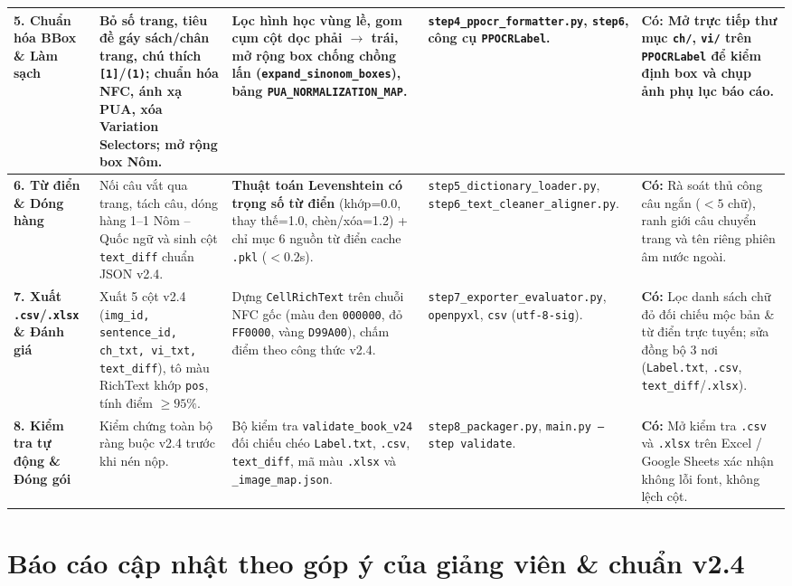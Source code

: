 \documentclass[12pt,a4paper]{article}
\begin{document}
\begin{longtable}{>{\raggedright\arraybackslash}p{2.4cm} >{\raggedright\arraybackslash}p{3.8cm} >{\raggedright\arraybackslash}p{4.3cm} >{\raggedright\arraybackslash}p{2.7cm} >{\raggedright\arraybackslash}p{3.0cm}}
\midrule
\textbf{5. Chuẩn hóa BBox \& Làm sạch} & Bỏ số trang, tiêu đề gáy sách/chân trang, chú thích \texttt{[1]}/\texttt{(1)}; chuẩn hóa NFC, ánh xạ PUA, xóa Variation Selectors; mở rộng box Nôm. & Lọc hình học vùng lề, gom cụm cột dọc phải $\to$ trái, mở rộng box chống chồng lấn (\texttt{expand\_sinonom\_boxes}), bảng \texttt{PUA\_NORMALIZATION\_MAP}. & \texttt{step4\_ppocr\_formatter.py}, \texttt{step6}, công cụ \texttt{PPOCRLabel}. & \textbf{Có:} Mở trực tiếp thư mục \texttt{ch/}, \texttt{vi/} trên \texttt{PPOCRLabel} để kiểm định box và chụp ảnh phụ lục báo cáo. \\
\midrule
\textbf{6. Từ điển \& Dóng hàng} & Nối câu vắt qua trang, tách câu, dóng hàng 1--1 Nôm -- Quốc ngữ và sinh cột \texttt{text\_diff} chuẩn JSON v2.4. & \textbf{Thuật toán Levenshtein có trọng số từ điển} (khớp=0.0, thay thế=1.0, chèn/xóa=1.2) + chỉ mục 6 nguồn từ điển cache \texttt{.pkl} ($<0.2$s). & \texttt{step5\_dictionary\_loader.py}, \texttt{step6\_text\_cleaner\_aligner.py}. & \textbf{Có:} Rà soát thủ công câu ngắn ($<5$ chữ), ranh giới câu chuyển trang và tên riêng phiên âm nước ngoài. \\
\midrule
\textbf{7. Xuất \texttt{.csv}/\texttt{.xlsx} \& Đánh giá} & Xuất 5 cột v2.4 (\texttt{img\_id, sentence\_id, ch\_txt, vi\_txt, text\_diff}), tô màu RichText khớp \texttt{pos}, tính điểm $\ge 95\%$. & Dựng \texttt{CellRichText} trên chuỗi NFC gốc (màu đen \texttt{000000}, đỏ \texttt{FF0000}, vàng \texttt{D99A00}), chấm điểm theo công thức v2.4. & \texttt{step7\_exporter\_evaluator.py}, \texttt{openpyxl}, \texttt{csv} (\texttt{utf-8-sig}). & \textbf{Có:} Lọc danh sách chữ đỏ đối chiếu mộc bản \& từ điển trực tuyến; sửa đồng bộ 3 nơi (\texttt{Label.txt}, \texttt{.csv}, \texttt{text\_diff}/\texttt{.xlsx}). \\
\midrule
\textbf{8. Kiểm tra tự động \& Đóng gói} & Kiểm chứng toàn bộ ràng buộc v2.4 trước khi nén nộp. & Bộ kiểm tra \texttt{validate\_book\_v24} đối chiếu chéo \texttt{Label.txt}, \texttt{.csv}, \texttt{text\_diff}, mã màu \texttt{.xlsx} và \texttt{\_image\_map.json}. & \texttt{step8\_packager.py}, \texttt{main.py --step validate}. & \textbf{Có:} Mở kiểm tra \texttt{.csv} và \texttt{.xlsx} trên Excel / Google Sheets xác nhận không lỗi font, không lệch cột. \\
\bottomrule
\end{longtable}

\section{Báo cáo cập nhật theo góp ý của giảng viên \& chuẩn v2.4}
\end{document}

